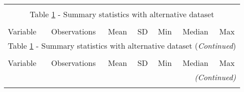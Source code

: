 \begin{longtable}{lcccccc}\\
	\label{tab:summary barth}\\
	\multicolumn{7}{c}{Table \ref{tab:summary barth} - Summary statistics with alternative dataset}\\ \hline \hline\\
	
	Variable   &   Observations &    Mean &          SD&         Min&    Median &    Max\\
	
	\hline \endfirsthead
	
	\multicolumn{7}{c}{Table \ref{tab:summary barth} - Summary statistics with alternative dataset (\textit{Continued})}\\ \hline \hline\\
	
	Variable   &   Observations &    Mean &          SD&         Min&     Median  &  Max\\
	
	\hline \endhead
	\hline
	\multicolumn{7}{r}{{\textit{(Continued)}}}\\ \endfoot
	
	\endlastfoot
	

\end{longtable}
